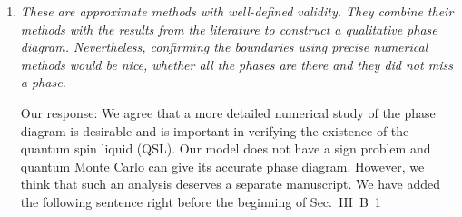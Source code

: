 \documentclass[
onecolumn,
superscriptaddress,
longbibliography,
nofootinbib,
 amsmath,amssymb,
 aps,
prb
]{revtex4-2}
\newcommand{\commentGN}[1]{{\color{purple}\footnotesize{GN: #1}}}
\newcommand{\response}[1]{\textcolor{Mulberry}{#1}}
\newcommand{\wesay}[1]{
	\begin{leftborder}
		\color{BrickRed}{#1}
	\end{leftborder}
}
\begin{document}
\begin{enumerate}
\textit{(2) Perturbational expansion in $\Omega$, the quantum oscillations (they do it using a Schrieffer-Wolff transformation, so they get a series of operators that can be used on different initial states). 
They evaluate the corrections up to the fourth order in three phases, the ferromagnet, the Rokhsar-Kivelson wave function (a variational ansatz for the quantum spin liquid), and an antiferromagnet that will have higher energy.}

\textit{(3) Gauge mean-field to get the stability of the quantum spin liquid.}


\item \textit{These are approximate methods with well-defined validity. They combine
their methods with the results from the literature to construct a
qualitative phase diagram. Nevertheless, confirming the boundaries
using precise numerical methods would be nice, whether all the phases
are there and they did not miss a phase.}

\response{Our response: We agree that a more detailed numerical study of the phase diagram is desirable and is important in verifying the existence of the quantum spin liquid (QSL). Our model does not have a sign problem and quantum Monte Carlo can give its accurate phase diagram. However, we think that such an analysis deserves a separate manuscript. We have added the following sentence right before the beginning of  Sec.~III~B~1}
\wesay{We note that, to be certain about the existence of all the phases we found and about not missing any additional phases, a more detailed quantum Monte Carlo study is required, and we leave it for future work.}


\end{enumerate}
\end{document}
